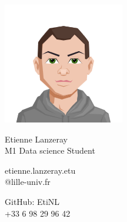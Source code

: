 \documentclass{article}
\begin{document}
\centering \includegraphics[width=.2\linewidth]{Avatar.png}\\[5pt]
\parbox{2in}{\Large \centering Etienne Lanzeray\\[1pt]
\normalsize M1 Data science Student}

\vfill
\raggedright
\begin{multicols}{2}
\small etienne.lanzeray.etu \\
\small @lille-univ.fr

\columnbreak
\raggedleft
\small GitHub: EtiNL \\
\small +33 6 98 29 96 42%
\end{multicols}%
\end{document}
